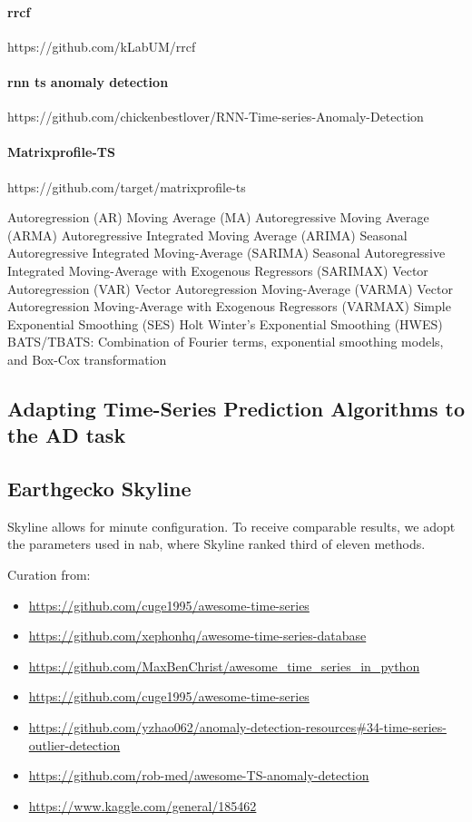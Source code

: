 \paragraph{rrcf}
https://github.com/kLabUM/rrcf

\paragraph{rnn ts anomaly detection}
https://github.com/chickenbestlover/RNN-Time-series-Anomaly-Detection

\paragraph{Matrixprofile-TS}
https://github.com/target/matrixprofile-ts



Autoregression (AR)
Moving Average (MA)
Autoregressive Moving Average (ARMA)
Autoregressive Integrated Moving Average (ARIMA)
Seasonal Autoregressive Integrated Moving-Average (SARIMA)
Seasonal Autoregressive Integrated Moving-Average with Exogenous Regressors (SARIMAX)
Vector Autoregression (VAR)
Vector Autoregression Moving-Average (VARMA)
Vector Autoregression Moving-Average with Exogenous Regressors (VARMAX)
Simple Exponential Smoothing (SES)
Holt Winter’s Exponential Smoothing (HWES)
BATS/TBATS: Combination of Fourier terms, exponential smoothing models, and Box-Cox transformation 

\subsection{Adapting Time-Series Prediction Algorithms to the AD task}

\subsection{Earthgecko Skyline}
Skyline allows for minute configuration. To receive comparable results, we adopt
the parameters used in \gls{nab}, where Skyline ranked third of eleven methods.

Curation from:
\begin{itemize}
    \item \url{https://github.com/cuge1995/awesome-time-series}
    \item \url{https://github.com/xephonhq/awesome-time-series-database}
    \item \url{https://github.com/MaxBenChrist/awesome_time_series_in_python}
    \item \url{https://github.com/cuge1995/awesome-time-series}
    \item \url{https://github.com/yzhao062/anomaly-detection-resources#34-time-series-outlier-detection}
    \item \url{https://github.com/rob-med/awesome-TS-anomaly-detection}
    \item \url{https://www.kaggle.com/general/185462}
\end{itemize}


